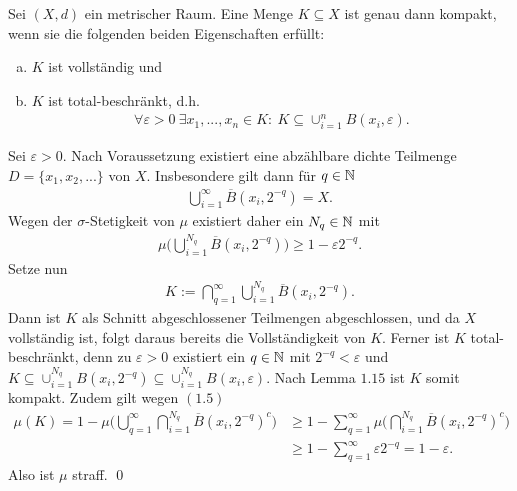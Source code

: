 \begin{lemma}
    Sei $(X,d)$ ein metrischer Raum. Eine Menge $K \subseteq X$ ist genau dann kompakt, wenn sie die folgenden beiden Eigenschaften erfüllt: 
    \begin{enumerate}[(a)]
        \item $K$ ist vollständig und 
        \item $K$ ist total-beschränkt, d.h.
        \begin{align*}
            \forall  \varepsilon > 0 \ \exists x_1,...,x_n \in K: \  K \subseteq \cup_{i=1}^n B(x_i, \varepsilon). 
        \end{align*} 
\end{enumerate}
\end{lemma}

\begin{proof*}
    Sei $\varepsilon > 0$. Nach Voraussetzung existiert eine abzählbare dichte Teilmenge $D = \{x_1, x_2,...\}$ von $X$. Insbesondere gilt dann für $q \in \mathbb{N} $
    \begin{align*}
        \bigcup_{i = 1}^{\infty}\overline{B}(x_i, 2^{-q}) = X.
    \end{align*}
    Wegen der $\sigma$-Stetigkeit von $\mu$ existiert daher ein $N_q \in \mathbb{N}$ mit 
    \begin{align}
        \mu\big(\bigcup_{i=1}^{N_q}\overline{B}(x_i, 2^{-q})\big) \geq 1 - \varepsilon 2^{-q}. 
    \end{align}
    Setze nun 
    \begin{align*}
        K := \bigcap_{q = 1}^{\infty}\bigcup_{i=1}^{N_q}\overline{B}(x_i, 2^{-q}). 
    \end{align*}
    Dann ist $K$ als Schnitt abgeschlossener Teilmengen abgeschlossen, und da $X$ vollständig ist, folgt daraus bereits die Vollständigkeit von $K$. 
    Ferner ist $K$ total-beschränkt, denn zu $\varepsilon > 0$ existiert ein $q \in \mathbb{N}$ mit $2^{-q} < \varepsilon$ und $K \subseteq \cup_{i=1}^{N_q}B(x_i, 2^{-q}) \subseteq \cup_{i=1}^{N_q}B(x_i, \varepsilon)$. 
    Nach Lemma $1.15$ ist $K$ somit kompakt. Zudem gilt wegen $(1.5)$
    \begin{align*}
        \mu(K)  = 1 - \mu\big(\bigcup_{q = 1}^{\infty}\bigcap_{i=1}^{N_q}\overline{B}(x_i, 2^{-q})^c\big) 
                &\geq 1 - \sum_{q=1}^{\infty} \mu\big(\bigcap_{i=1}^{N_q}\overline{B}(x_i, 2^{-q})^c\big) \\\
                &\geq 1 - \sum_{q=1}^{\infty} \varepsilon 2^{-q} = 1 - \varepsilon.
    \end{align*}
    Also ist $\mu$ straff. \qed
\end{proof*}


